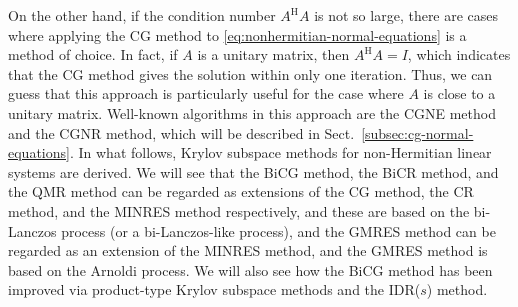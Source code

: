 {On the other hand, if the condition number $A^{\mathrm H}A$ is not so large, there are cases where applying the CG method to \eqref{eq:nonhermitian-normal-equations} is a method of choice. In fact, if $A$ is a unitary matrix, then $A^{\mathrm H}A=I$, which indicates that the CG method gives the solution within only one iteration. Thus, we can guess that this approach is particularly useful for the case where $A$ is close to a unitary matrix. Well-known algorithms in this approach are the CGNE method and the CGNR method, which will be described in Sect.\ \ref{subsec:cg-normal-equations}.}
{In what follows, Krylov subspace methods for non-Hermitian linear systems are derived. We will see that the BiCG method, the BiCR method, and the QMR method can be regarded as extensions of the CG method, the CR method, and the MINRES method respectively, and these are based on the bi-Lanczos process (or a bi-Lanczos-like process), and the GMRES method can be regarded as an extension of the MINRES method, and the GMRES method is based on the Arnoldi process. We will also see how the BiCG method has been improved via product-type Krylov subspace methods and the IDR($s$) method.}
